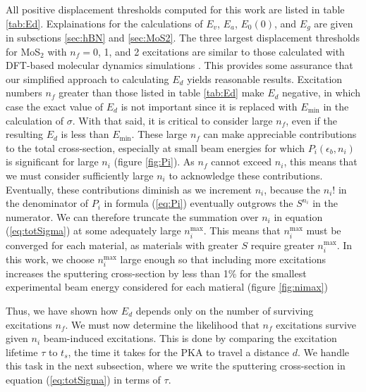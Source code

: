 \documentclass{article}
\begin{document}
All positive displacement thresholds computed for this work are listed in table
\ref{tab:Ed}.
Explainations for the calculations of $E_v$, $E_a$, $E_0(0)$, and $E_g$ are
given in subsctions \ref{sec:hBN} and \ref{sec:MoS2}.
The three largest displacement thresholds for MoS$_2$ with $n_f = 0$, 1, and 2
excitations are similar to those calculated with DFT-based molecular dynamics
simulations \cite{Kretschmer2020}.
This provides some assurance that our simplified approach to calculating $E_d$
yields reasonable results.
Excitation numbers $n_f$ greater than those listed in table \ref{tab:Ed} make
$E_d$ negative, in which case the exact value of $E_d$ is not important since
it is replaced with $E_\text{min}$ in the calculation of $\sigma$.
With that said, it is critical to consider large $n_f$, even if the resulting
$E_d$ is less than $E_\text{min}$.
These large $n_f$ can make appreciable contributions to the total
cross-section, especially at small beam energies for which $P_i(\epsilon_b,
n_i)$ is significant for large $n_i$ (figure \ref{fig:Pi}).
As $n_f$ cannot exceed $n_i$, this means that we must consider sufficiently
large $n_i$ to acknowledge these contributions.
Eventually, these contributions diminish as we increment $n_i$, because the
$n_i!$ in the denominator of $P_i$ in formula (\ref{eq:Pi}) eventually
outgrows the $S^{n_i}$ in the numerator.
We can therefore truncate the summation over $n_i$ in equation
(\ref{eq:totSigma}) at some adequately large $n_i^\text{max}$.
This means that $n_i^\text{max}$ must be converged for each material, as
materials with greater $S$ require greater $n_i^\text{max}$.
In this work, we choose $n_i^\text{max}$ large enough so that including more
excitations increases the sputtering cross-section by less than 1\% for the
smallest experimental beam energy considered for each matieral (figure
\ref{fig:nimax})

Thus, we have shown how $E_d$ depends only on the number of surviving
excitations $n_f$.  We must now determine the likelihood that $n_f$ excitations
survive given $n_i$ beam-induced excitations.
This is done by comparing the excitation lifetime $\tau$ to $t_s$, the time it
takes for the PKA to travel a distance $d$.
We handle this task in the next subsection, where we write the sputtering
cross-section in equation (\ref{eq:totSigma}) in terms of
$\tau$.
\end{document}
